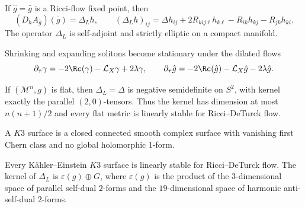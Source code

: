 \begin{proposition}
\label{prop:chow-iv-lichnerowicz-linearization}
If $\hat g=\bar g$ is a Ricci-flow fixed point, then
\[
 (D_hA_{\bar g})(\bar g)=\Delta_Lh,
 \qquad
 (\Delta_Lh)_{ij}=\Delta h_{ij}+2R_{kij\ell}h_{k\ell}-R_{ik}h_{kj}-R_{jk}h_{ki}.
 \tag{35.7}
\]
The operator $\Delta_L$ is self-adjoint and strictly elliptic on a compact
manifold.
\end{proposition}

Shrinking and expanding solitons become stationary under the dilated flows
\[
 \partial_\tau\gamma=-2\Rc(\gamma)-\mathcal L_X\gamma+2\lambda\gamma,
 \qquad
 \partial_\tau\hat g=-2\Rc(\hat g)-\mathcal L_X\hat g-2\lambda\hat g.
\]

\begin{proposition}
\label{prop:chow-iv-flat-linear-stability}
If $(\mathcal M^n,g)$ is flat, then $\Delta_L=\Delta$ is negative
semidefinite on $S^2$, with kernel exactly the parallel $(2,0)$-tensors.
Thus the kernel has dimension at most $n(n+1)/2$ and every flat metric is
linearly stable for Ricci--DeTurck flow.
\end{proposition}

\begin{definition}
\label{def:chow-iv-k3-surface}
A $K3$ surface is a closed connected smooth complex surface with vanishing
first Chern class and no global holomorphic $1$-form.
\end{definition}

\begin{proposition}
\label{prop:chow-iv-k3-linear-stability}
Every K\"ahler--Einstein $K3$ surface is linearly stable for Ricci--DeTurck
flow.  The kernel of $\Delta_L$ is $\varepsilon(g)\oplus G$, where
$\varepsilon(g)$ is the product of the $3$-dimensional space of parallel
self-dual $2$-forms and the $19$-dimensional space of harmonic anti-self-dual
$2$-forms.
\end{proposition}


